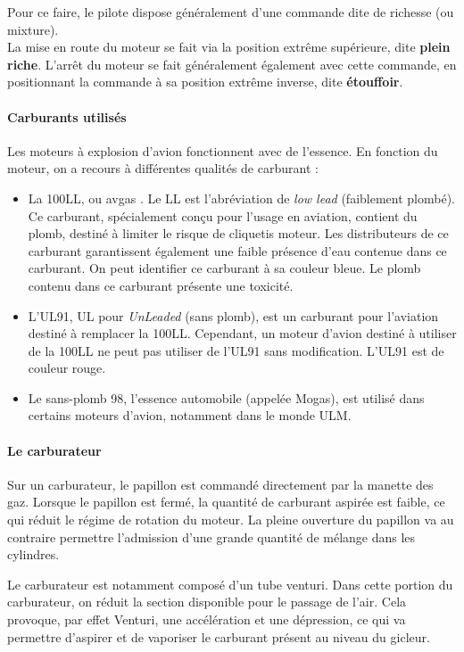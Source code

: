 	Pour ce faire, le pilote dispose généralement d'une commande dite de richesse (ou mixture). \\
	
	La mise en route du moteur se fait via la position extrême supérieure, dite \textbf{plein riche}. L'arrêt du moteur se fait généralement également avec cette commande, en positionnant la commande à sa position extrême inverse, dite \textbf{étouffoir}.
	
	\paragraph{Carburants utilisés}
	Les moteurs à explosion d'avion fonctionnent avec de l'essence. En fonction du moteur, on a recours à différentes qualités de carburant :
	\begin{itemize}
		\item La 100LL, ou avgas . Le LL est l'abréviation de \textit{low lead} (faiblement plombé). Ce carburant, spécialement conçu pour l'usage en aviation, contient du plomb, destiné à limiter le risque de cliquetis moteur. Les distributeurs de ce carburant garantissent également une faible présence d'eau contenue dans ce carburant. On peut identifier ce carburant à sa couleur bleue. Le plomb contenu dans ce carburant présente une toxicité.
		\item L'UL91, UL pour \textit{UnLeaded} (sans plomb), est un carburant pour l'aviation destiné à remplacer la 100LL. Cependant, un moteur d'avion destiné à utiliser de la 100LL ne peut pas utiliser de l'UL91 sans modification. L'UL91 est de couleur rouge.
		\item Le sans-plomb 98, l'essence automobile (appelée Mogas), est utilisé dans certains moteurs d'avion, notamment dans le monde ULM.
	\end{itemize}
	
	\paragraph{Le carburateur}
	
	Sur un carburateur, le papillon est commandé directement par la manette des gaz. Lorsque le papillon est fermé, la quantité de carburant aspirée est faible, ce qui réduit le régime de rotation du moteur. La pleine ouverture du papillon va au contraire permettre l'admission d'une grande quantité de mélange dans les cylindres.
	
	Le carburateur est notamment composé d'un tube venturi. Dans cette portion du carburateur, on réduit la section disponible pour le passage de l'air. Cela provoque, par effet Venturi, une accélération et une dépression, ce qui va permettre d'aspirer et de vaporiser le carburant présent au niveau du gicleur.
	
